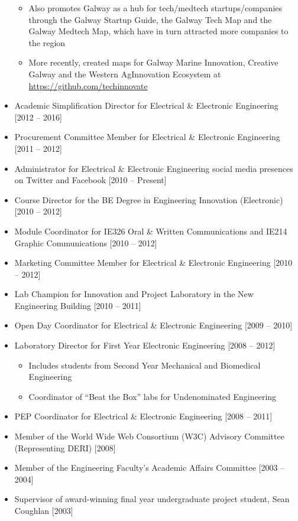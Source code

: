 \documentclass[10pt,a4paper]{res} %
\begin{document}
\begin{resume}
\begin{itemize}
\begin{itemize}
\item Also promotes Galway as a hub for tech/medtech startups/companies through the Galway Startup Guide, the Galway Tech Map and the Galway Medtech Map, which have in turn attracted more companies to the region
\item More recently, created maps for Galway Marine Innovation, Creative Galway and the Western AgInnovation Ecosystem at \url{https://github.com/techinnovate}
\end{itemize}
\item Academic Simplification Director for Electrical \& Electronic Engineering [2012 -- 2016]
\item Procurement Committee Member for Electrical \& Electronic Engineering [2011 -- 2012]
\item Administrator for Electrical \& Electronic Engineering social media presences on Twitter and Facebook [2010 -- Present]
\item Course Director for the BE Degree in Engineering Innovation (Electronic) [2010 -- 2012]
\item Module Coordinator for IE326 Oral \& Written Communications and IE214 Graphic Communications [2010 -- 2012]
\item Marketing Committee Member for Electrical \& Electronic Engineering [2010 -- 2012]
\item Lab Champion for Innovation and Project Laboratory in the New Engineering Building [2010 -- 2011]
\item Open Day Coordinator for Electrical \& Electronic Engineering [2009 -- 2010]
\item Laboratory Director for First Year Electronic Engineering [2008 -- 2012]
\begin{itemize} \itemsep -2pt
\item Includes students from Second Year Mechanical and Biomedical Engineering
\item Coordinator of ``Beat the Box'' labs for Undenominated Engineering
\end{itemize}
\item PEP Coordinator for Electrical \& Electronic Engineering [2008 -- 2011]
\item Member of the World Wide Web Consortium (W3C) Advisory Committee (Representing DERI) [2008]
\item Member of the Engineering Faculty's Academic Affairs Committee [2003 -- 2004]
\item Supervisor of award-winning final year undergraduate project student, Sean Coughlan [2003]

\end{itemize}
\end{resume}
\end{document}

